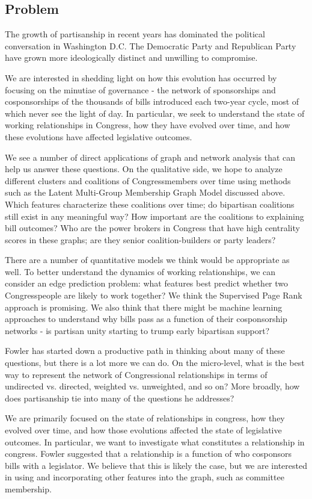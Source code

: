 \subsection{Problem}

The growth of partisanship in recent years has dominated the political
conversation in Washington D.C. The Democratic Party and Republican Party have
grown more ideologically distinct and unwilling to compromise.

We are interested in shedding light on how this evolution has occurred by
focusing on the minutiae of governance - the network of sponsorships and
cosponsorships of the thousands of bills introduced each two-year cycle, most of
which never see the light of day. In particular, we seek to understand the state
of working relationships in Congress, how they have evolved over time, and how
these evolutions have affected legislative outcomes.

We see a number of direct applications of graph and network analysis that can
help us answer these questions. On the qualitative side, we hope to analyze
different clusters and coalitions of Congressmembers over time using methods
such as the Latent Multi-Group Membership Graph Model discussed above. Which
features characterize these coalitions over time; do bipartisan coalitions still
exist in any meaningful way? How important are the coalitions to explaining bill
outcomes? Who are the power brokers in Congress that have high centrality scores
in these graphs; are they senior coalition-builders or party leaders?

There are a number of quantitative models we think would be appropriate as well.
To better understand the dynamics of working relationships, we can consider an
edge prediction problem: what features best predict whether two Congresspeople
are likely to work together? We think the Supervised Page Rank approach is
promising. We also think that there might be machine learning approaches to
understand why bills pass as a function of their cosponsorship networks - is
partisan unity starting to trump early bipartisan support?

Fowler has started down a productive path in thinking about many of these
questions, but there is a lot more we can do. On the micro-level, what is the
best way to represent the network of Congressional relationships in terms of
undirected vs. directed, weighted vs. unweighted, and so on? More broadly, how
does partisanship tie into many of the questions he addresses?

We are primarily focused on the state of relationships in congress, how  they
evolved over time, and how those evolutions affected the state of  legislative
outcomes. In particular, we want to investigate what constitutes a  relationship
in congress. Fowler suggested that a relationship is a function  of who
cosponsors bills with a legislator. We believe that this is likely the  case,
but we are interested in using and incorporating other features into  the graph,
such as committee membership.

